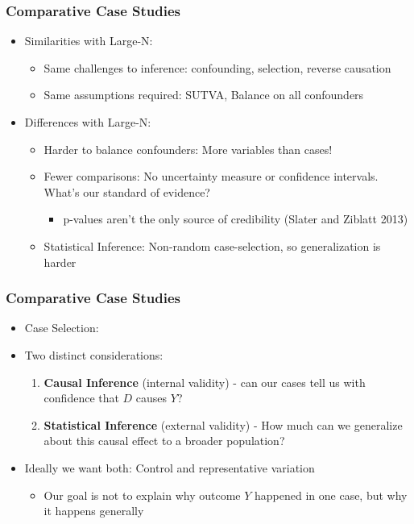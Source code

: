 \documentclass[xcolor=x11names,compress]{beamer}\usepackage[]{graphicx}\usepackage[]{color}
\renewcommand{\(}{\begin{columns}}
\renewcommand{\)}{\end{columns}}
\newcommand{\<}[1]{\begin{column}{#1}}
\renewcommand{\>}{\end{column}}
\begin{document}
\begin{frame}
\frametitle{Comparative Case Studies}
\begin{itemize}
\item Similarities with Large-N:
\pause
\begin{itemize}
\item Same challenges to inference: confounding, selection, reverse causation
\pause
\item Same assumptions required: SUTVA, Balance on all confounders
\pause
\end{itemize}
\item Differences with Large-N:
\begin{itemize}
\item Harder to balance confounders: More variables than cases!
\pause
\item Fewer comparisons: No uncertainty measure or confidence intervals. What's our standard of evidence?
\pause
\begin{itemize}
\item p-values aren't the only source of credibility (Slater and Ziblatt 2013)
\end{itemize}
\pause
\item Statistical Inference: Non-random case-selection, so generalization is harder
\end{itemize}
\end{itemize}
\end{frame}

\begin{frame}
\frametitle{Comparative Case Studies}
\begin{itemize}
\item Case Selection:
\pause
\item Two distinct considerations:
\pause
\begin{enumerate}
\item \textbf{Causal Inference} (internal validity) - can our cases tell us with confidence that $D$ causes $Y$?
\pause
\item \textbf{Statistical Inference} (external validity) - How much can we generalize about this causal effect to a broader population?
\pause
\end{enumerate}
\item Ideally we want both: Control and representative variation
\pause
\begin{itemize}
\item Our goal is not to explain why outcome $Y$ happened in one case, but why it happens generally
\end{itemize}
\end{itemize}
\end{frame}
\end{document}
